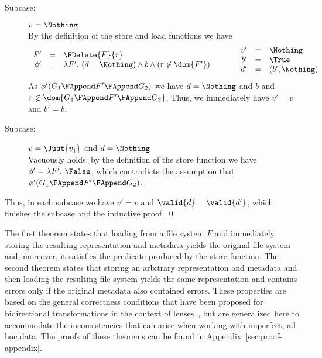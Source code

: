 {\begin{description}
\begin{description}
\item[Subcase:] $v = \Nothing$\\[1ex]
%
By the definition of the store and load functions we have
\[
\begin{array}{rcl}
F' &=& \FDelete{F}{r}\\
\phi' &=& \lambda F'.~(d = \Nothing) \wedge b \wedge (r \not\in \dom{F'})\\
\end{array}\hspace*{1cm}\begin{array}{rcl}
v' &=& \Nothing\\
b' &=& \True\\
d' &=& (b',\Nothing)\\
\end{array}
\]
As $\phi'(G_1 \FAppend F' \FAppend G_2)$ we have $d
= \Nothing$ and $b$ and $r \not\in \dom{G_1 \FAppend F' \FAppend
  G_2}$. Thus, we immediately have $v' = v$ and $b' = b$. 
\item[Subcase:] $v = \Just{v_1}$ and $d = \Nothing$\\[1ex]
%
Vacuously holds: by the definition of the store function we have
$\phi' = \lambda F'.~\False$, which contradicts the assumption that
$\phi'(G_1 \FAppend F' \FAppend G_2)$.
\end{description}
Thus, in each subcase we have $v' = v$ and $\valid{d} = \valid{d'}$,
which finishes the subcase and the inductive proof. \hfill \qed
\end{description}}

\smallskip

\noindent The first theorem states that loading from a file system $F$
and immediately storing the resulting representation and metadata
yields the original file system and, moreover, it satisfies the
predicate produced by the store function. The second theorem states
that storing an arbitrary representation and metadata and then loading
the resulting file system yields the same representation and contains
errors only if the original metadata also contained errors. These
properties are based on the general correctness conditions that have
been proposed for bidirectional transformations in the context of
lenses~\cite{lenses}, but are generalized here to accommodate the
inconsistencies that can arise when working with imperfect, ad hoc
data. The proofs of these theorems can be found in
Appendix~\ref{sec:proof-appendix}. 

